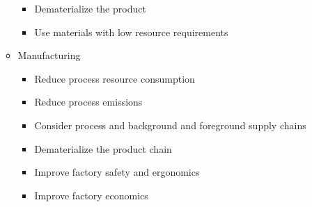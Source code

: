 \begin{itemize}
\begin{itemize}
        \begin{itemize}

          \item Dematerialize the product

          \item Use materials with low resource requirements

        \end{itemize}

      \item Manufacturing

        \begin{itemize}

          \item Reduce process resource consumption

          \item Reduce process emissions

          \item Consider process and background and foreground supply chains

          \item Dematerialize the product chain

          \item Improve factory safety and ergonomics

          \item Improve factory economics

        \end{itemize}

    \end{itemize}

\end{itemize}




